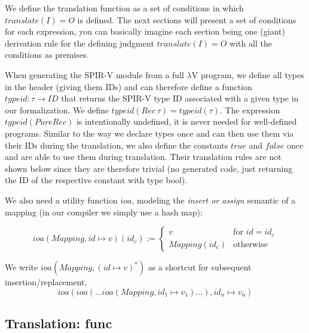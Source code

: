 \documentclass[letterpaper,12pt]{article}
\begin{document}
We define the translation function as a set of conditions in which $translate(I) = O$
is defined. The next sections will present a set of conditions for each
expression, you can basically imagine each section being one (giant)
derivation rule for the defining judgment $translate(I) = O$
with all the conditions as premises. 

When generating the SPIR-V module from a full $\lambda$V program,
we define all types in the header (giving them IDs) and can therefore define a
function $typeid: \tau \rightarrow ID$ that returns the SPIR-V type ID
associated with a given type in our formalization. 
We define $typeid(Rec\: \tau) = typeid(\tau)$. The expression $typeid(PureRec)$
is intentionally undefined, it is never needed for well-defined programs.
Similar to the way we declare types once and can then use them via their
IDs during the translation, we also define the constants $true$ and $false$
once and are able to use them during translation. Their translation
rules are not shown below since they are therefore trivial (no generated
code, just returning the ID of the respective constant with type bool).

We also need a utility function $ioa$, modeling
the \textit{insert or assign} semantic of a mapping (in our compiler
we simply use a hash map):

\[
	ioa(Mapping, id \mapsto v)(id_c) :=
	\begin{cases}
		v & \text{for } id = id_c \\
		Mapping(id_c) & \text{otherwise}
	\end{cases}
\]

We write $ioa(Mapping, (id \mapsto v)^*)$ as a shortcut for subsequent
insertion/replacement, \\
\[
	ioa(ioa( \dots ioa(Mapping, id_1 \mapsto v_1) \dots ), id_n \mapsto v_n)
\]

\subsection{Translation: func}
\end{document}
